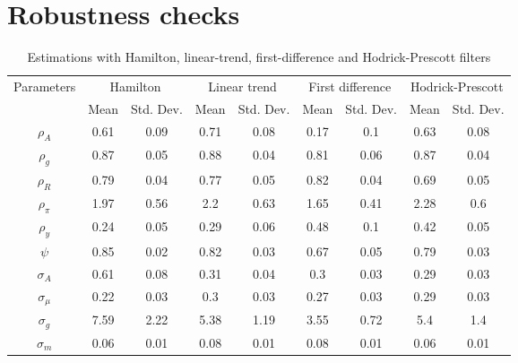 
\section{Robustness checks}

\label{robustness_checks}

\begin{table}[H]
\begin{center}
\begin{tabular}{ccccccccc}
\toprule
Parameters & \multicolumn{2}{c}{Hamilton} & \multicolumn{2}{c}{Linear trend} & \multicolumn{2}{c}{First difference} & \multicolumn{2}{c}{Hodrick-Prescott}\\
\cmidrule(lr){2-3} \cmidrule(lr){4-5} \cmidrule(lr){6-7} \cmidrule(lr){8-9} & Mean & Std. Dev. &  Mean & Std. Dev. &  Mean & Std. Dev. &  Mean & Std. Dev.\\ \midrule 
$\rho_{A}$ & 0.61 & 0.09 & 0.71 & 0.08 & 0.17 & 0.1 & 0.63 & 0.08\\ 
$\rho_g$ & 0.87 & 0.05 & 0.88 & 0.04 & 0.81 & 0.06 & 0.87 & 0.04\\ 
$\rho_R$ & 0.79 & 0.04 & 0.77 & 0.05 & 0.82 & 0.04 & 0.69 & 0.05\\ 
$\rho_\pi$ & 1.97 & 0.56 & 2.2 & 0.63 & 1.65 & 0.41 & 2.28 & 0.6\\ 
$\rho_y$ & 0.24 & 0.05 & 0.29 & 0.06 & 0.48 & 0.1 & 0.42 & 0.05\\ 
$\psi$ & 0.85 & 0.02 & 0.82 & 0.03 & 0.67 & 0.05 & 0.79 & 0.03\\ 
$\sigma_A$ & 0.61 & 0.08 & 0.31 & 0.04 & 0.3 & 0.03 & 0.29 & 0.03\\ 
$\sigma_\mu$ & 0.22 & 0.03 & 0.3 & 0.03 & 0.27 & 0.03 & 0.29 & 0.03\\ 
$\sigma_g$ & 7.59 & 2.22 & 5.38 & 1.19 & 3.55 & 0.72 & 5.4 & 1.4\\ 
$\sigma_m$ & 0.06 & 0.01 & 0.08 & 0.01 & 0.08 & 0.01 & 0.06 & 0.01\\ 
\bottomrule 
\end{tabular}
\end{center}
\caption{Estimations with Hamilton, linear-trend, first-difference and Hodrick-Prescott filters}
\end{table}
